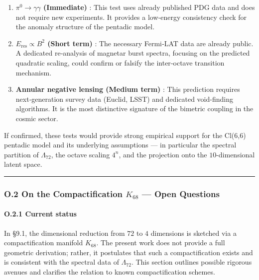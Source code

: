 \documentclass[11pt]{article}
\begin{document}
\begin{enumerate}
\def\labelenumi{\arabic{enumi}.}
\item
  \textbf{\(\pi^0 \to \gamma\gamma\) (Immediate)} : This test uses
  already published PDG data and does not require new experiments. It
  provides a low‑energy consistency check for the anomaly structure of
  the pentadic model.
\item
  \textbf{\(E_{\text{res}} \propto B^2\) (Short term)} : The necessary
  Fermi‑LAT data are already public. A dedicated re‑analysis of magnetar
  burst spectra, focusing on the predicted quadratic scaling, could
  confirm or falsify the inter‑octave transition mechanism.
\item
  \textbf{Annular negative lensing (Medium term)} : This prediction
  requires next‑generation survey data (Euclid, LSST) and dedicated
  void-finding algorithms. It is the most distinctive signature of the
  bimetric coupling in the cosmic sector.
\end{enumerate}

If confirmed, these tests would provide strong empirical support for the
Cl(6,6) pentadic model and its underlying assumptions --- in particular
the spectral partition of \(\Lambda_{72}\), the octave scaling \(4^n\),
and the projection onto the \(10\)-dimensional latent space.

\begin{center}\rule{0.5\linewidth}{0.5pt}\end{center}

\hypertarget{o.2-on-the-compactification-k_68-open-questions}{%
\subsubsection{\texorpdfstring{O.2 On the Compactification \(K_{68}\)
--- Open
Questions}{O.2 On the Compactification K\_\{68\} --- Open Questions}}\label{o.2-on-the-compactification-k_68-open-questions}}

\hypertarget{o.2.1-current-status}{%
\paragraph{O.2.1 Current status}\label{o.2.1-current-status}}

In §9.1, the dimensional reduction from \(72\) to \(4\) dimensions is
sketched via a compactification manifold \(K_{68}\). The present work
does not provide a full geometric derivation; rather, it postulates that
such a compactification exists and is consistent with the spectral data
of \(\Lambda_{72}\). This section outlines possible rigorous avenues and
clarifies the relation to known compactification schemes.
\end{document}
